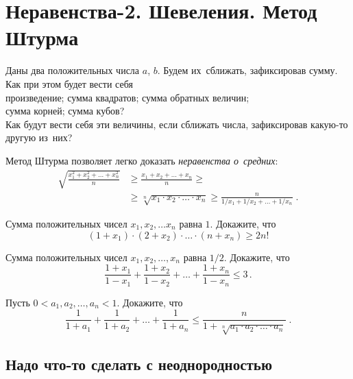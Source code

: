 

\section*{Неравенства-2. Шевеления. Метод Штурма}


\resetsubproblem
Даны два положительных числа $a$, $b$.
Будем их~сближать, зафиксировав сумму.
Как при этом будет вести себя
\\
\sp произведение;
\quad
\sp сумма квадратов;
\quad
\sp сумма обратных величин;
\\
\sp сумма корней;
\quad
\sp сумма кубов?
\\
Как будут вести себя эти величины, если сближать числа, зафиксировав какую-то
другую из~них?

Метод Штурма позволяет легко доказать \emph{неравенства о~средних}:
\begin{align*}
    \sqrt{\frac{x_1^2 + x_2^2 + \ldots +x_n^2}{n}}
& \geq
    \frac{x_1 + x_2 + \ldots + x_n}{n}
\geq \\ & \geq
    \sqrt[n]{x_1 \cdot x_2 \cdot \ldots \cdot x_n}
\geq
    \frac{n}{1 / x_1 + 1 / x_2 + \ldots + 1 / x_n}
\; . \end{align*}

\begin{problems}

\item
Сумма положительных чисел $x_1, x_2, \ldots x_n$ равна $1$.
Докажите, что
\[
    (1 + x_1) \cdot (2 + x_2) \cdot \ldots \cdot (n + x_n)
\geq
    2n!
\]

\item
Сумма положительных чисел $x_1, x_2, \ldots, x_n$ равна $1 / 2$.
Докажите, что
\[
    \frac{1 + x_1}{1 - x_1} +
    \frac{1 + x_2}{1 - x_2} +
    \ldots +
    \frac{1 + x_n}{1 - x_n}
\leq
    3
\, . \]

\item
Пусть $0 < a_1, a_2, \ldots, a_n < 1$.
Докажите, что
\[
    \frac{1}{1 + a_1} + \frac{1}{1 + a_2} +
    \ldots +
    \frac{1}{1 + a_n}
\leq
    \frac{n}{1 + \sqrt[n]{a_1 \cdot a_2 \cdot \ldots \cdot a_n}}
\; . \]

\end{problems}


\subsection*{Надо что-то сделать с неоднородностью}


